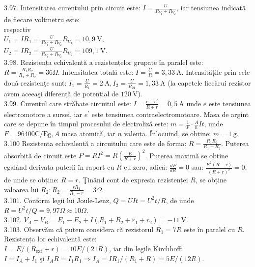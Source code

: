 3.97. Intensitatea curentului prin circuit este: $I=\frac{U}{R_{V_{1}}+R_{V_{2}}}$, iar tensiunea indicată de fiecare voltmetru este:\\ respectiv\\ $U_{1}=I R_{1}=\frac{U}{R_{V_{1}}+R_{V_{2}}} R_{V_{1}}=10,9 \mathrm{~V}$, \\$ U_{2}=I R_{2}=\frac{U}{R_{V_{1}}+R_{V_{2}}} R_{V_{2}}=109,1 \mathrm{~V}$.\\

3.98. Rezistența echivalentă a rezistențelor grupate în paralel este: $R=\frac{R_{1} R_{2}}{R_{1}+R_{2}}=36 \Omega$. Intensitatea totală este: $I=\frac{U}{R}=3,33 \mathrm{~A}$. Intensitățile prin cele douǎ rezistenţe sunt: $I_{1}=\frac{U}{R_{1}}=2 \mathrm{~A}, I_{2}=\frac{U}{R_{21}}=1,33 \mathrm{~A}$ (la capetele fiecărui rezistor avem aceeaşi diferență de potențial de $120 \mathrm{~V}$).\\

3.99. Curentul care străbate circuitul este: $I=\frac{e-e^{\prime}}{R+r}=0,5 \mathrm{~A}$ unde $e$ este tensiunea electromotore a sursei, iar $e^{\prime}$ este tensiunea contraelectromotoare. Masa de argint care se depune în timpul procesului de electroliză este: $m=\frac{1}{F} \cdot \frac{A}{n} I t$, unde $F=96400 \mathrm{C} / \mathrm{Eg}, A$ masa atomică, iar $n$ valența. Înlocuind, se obține: $m=1 \mathrm{~g}$.\\

3.100 Rezistenta echivalentă a circuitului care este de forma: $R=\frac{R_{1} R_{2}}{R_{1}+R_{2}}$. Puterea absorbită de circuit este $P=R I^{2}=R\left(\frac{E}{R+r}\right)^{2}$. Puterea maximă se obține egalând derivata puterii în raport cu $R$ cu zero, adică: $\frac{d P}{d R}=0$ sau: $\frac{E^{2}(R-r)}{(R+r)^{2}}=0$, de unde se obține: $R=r$. Ţinând cont de expresia rezistenței $R$, se obține valoarea lui $R_{2}: R_{2}=\frac{r R_{1}}{R_{1}-r}=3 \Omega$.\\

3.101. Conform legii lui Joule-Lenz, $Q=U I t=U^{2} t / R$, de unde $R=U^{2} t / Q=9,97 \Omega \approx 10 \Omega$.\\

3.102. $V_{A}-V_{B}=E_{1}-E_{2}+I\left(R_{1}+R_{2}+r_{1}+r_{2}\right)=-11 \mathrm{~V}$.\\

3.103. Observăm că putem considera că rezistorul $R_{1}=7 R$ este în paralel cu $R$. Rezistența lor echivalentă este:\\ $I=E /\left(R_{\mathrm{ext}}+r\right)=10 E /(21 R)$, iar din legile Kirchhoff: \\ $I=I_{A}+I_{1}$ şi $I_{A} R=I_{1} R_{1} \Rightarrow I_{A}=I R_{1} /\left(R_{1}+R\right)=5 E /(12 R)$.\\


